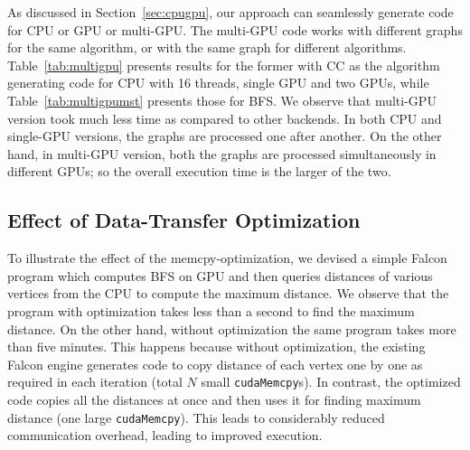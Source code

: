 As discussed in Section~\ref{sec:cpugpu}, our approach can seamlessly generate code for CPU or GPU or multi-GPU.
The multi-GPU code works with different graphs for the same algorithm, or with the same graph for different algorithms.
Table~\ref{tab:multigpu} presents results for the former with CC as the algorithm generating code for CPU with 16 threads, single GPU and two GPUs, while Table~\ref{tab:multigpumst} presents those for BFS.
We observe that multi-GPU version took much less time as compared to other backends. 
In both CPU and single-GPU versions, the graphs are processed one after another.
On the other hand, in multi-GPU version, both the graphs are processed simultaneously in different GPUs; so the overall execution time is the larger of the two. 

\subsection{Effect of Data-Transfer Optimization}\label{expt:optimizations}
To illustrate the effect of the memcpy-optimization, we devised a simple Falcon program which computes BFS on GPU and then queries distances of various vertices from the CPU to compute the maximum distance.
We observe that the program with optimization takes less than a second to find the maximum distance.
On the other hand, without optimization the same program takes more than five minutes. 
This happens because without optimization, the existing Falcon engine generates code to copy distance of each vertex one by one as required in each iteration (total $N$ small \texttt{cudaMemcpy}s).
In contrast, the optimized code copies all the distances at once and then uses it for finding maximum distance (one large \texttt{cudaMemcpy}).
This leads to considerably reduced communication overhead, leading to improved execution.





